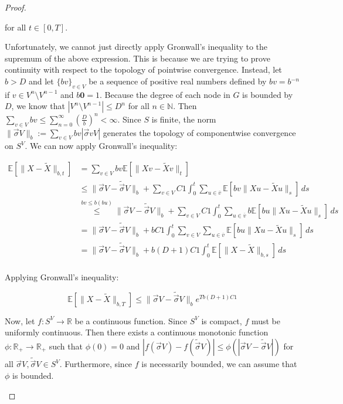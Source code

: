 \documentclass[12pt]{article}
\newcommand{\mb}{\mathbb}
\newcommand{\ra}{\rightarrow}
\newcommand{\ov}{\overline}
\newcommand{\os}{\overset}
\newcommand{\ind}{\hspace{24pt}}
\newcommand{\ex}[1]{\mb{E}\left[#1\right]}			%
\renewcommand{\root}{\mathbf{0}}				%
\renewcommand{\v}{v}							%
\newcommand{\vv}{u}								%
\renewcommand{\S}{S}							%
\newcommand{\s}{\sigma}							%
\newcommand{\sv}{\vec{\s}}						%
\renewcommand{\b}{b}							%
\newcommand{\T}{T}								%
\renewcommand{\t}{t}							%
\renewcommand{\tt}{s}							%
\newcommand{\X}{X}								%
\newcommand{\cl}{\ov}							%
\newcommand{\const}{C}							%
\newcommand{\degr}{D}							%
\newcommand{\sln}[1]{^{#1}}						%
\newcommand{\alt}[1]{\widetilde{#1}}			%
\begin{document}
\begin{proof}
\begin{enumerate}[(a)]
for all \(\t \in [0,\T]\).

\ind Unfortunately, we cannot just directly apply Gronwall's inequality to the supremum of the above expression. This is because we are trying to prove continuity with respect to the topology of pointwise convergence. Instead, let \(\b{} > \degr\) and let \(\{\b{\v}\}_{\v \in  V}\) be a sequence of positive real numbers defined by \(\b{\v} = \b{}^{-n}\) if \(\v \in  V\sln{n}\setminus  V\sln{n-1}\) and \(\b{\root} = 1\). Because the degree of each node in \(G\) is bounded by \(\degr\), we know that \(| V\sln{n}\setminus  V\sln{n-1}| \leq \degr^{n}\) for all \(n\in \mb{N}\). Then \(\sum_{\v \in  V} \b{\v} \leq \sum_{n=0}^\infty \left(\frac{\degr}{\b{}}\right)^{n} < \infty\). Since \(\S\) is finite, the norm \(\|\sv{}{ V}\|_{\b{}} := \sum_{\v \in  V} \b{\v}|\sv{\v}{ V}|\) generates the topology of componentwise convergence on \(\S^ V\). We can now apply Gronwall's inequality:

\begin{align*}
\ex{\|\X{}{} - \alt{\X}{{}{}}\|_{\b{},\t}} &= \sum_{\v \in  V} \b{\v}\ex{\|\X{\v}{} - \alt{\X}{{\v}{}}\|_\t}\\
&\leq \|\sv{}{ V} - \alt{\sv}{}{V}\|_{\b{}} + \sum_{\v \in  V}\const{1}\int_0^\t \sum_{\vv \in \cl{\v}} \ex{\b{\v}\|\X{\vv}{} - \alt{\X}{{\vv}{}}\|_\tt}\,d\tt\\
&\os{\b{\v}\leq \b{}(\b{\vv})}{\leq} \|\sv{}{ V} - \alt{\sv}{}{V}\|_{\b{}} + \sum_{\v \in  V}\const{1}\int_0^\t \sum_{\vv \in \cl{\v}} \b{}\ex{\b{\vv}\|\X{\vv}{} - \alt{\X}{{\vv}{}}\|_\tt}\,d\tt\\
&= \|\sv{}{ V} - \alt{\sv}{}{V}\|_{\b{}} + \b{}\const{1}\int_0^\t \sum_{\v \in  V}\sum_{\vv \in \cl{\v}} \ex{\b{\vv}\|\X{\vv}{} - \alt{\X}{{\vv}{}}\|_\tt}\,d\tt\\
&=\|\sv{}{ V} - \alt{\sv}{}{V}\|_{\b{}} + \b{}(\degr+1)\const{1}\int_0^\t \ex{\|\X{}{} - \alt{\X}{{}{}}\|_{\b{},\tt}}\,d\tt\\
\end{align*}

Applying Gronwall's inequality:

\[\ex{\|\X{}{} - \alt{\X}{{}{}}\|_{\b{},\T}} \leq \|\sv{}{ V} - \alt{\sv}{}{V}\|_{\b{}}e^{\T\b{}(\degr+1)\const{1}}\]

Now, let \(f: \S^ V \ra \mb{R}\) be a continuous function. Since \(\S^ V\) is compact, \(f\) must be uniformly continuous. Then there exists a continuous monotonic function \(\phi: \mb{R}_+ \ra \mb{R}_+\) such that \(\phi(0) = 0\) and \(|f(\sv{}{ V}) - f(\alt{\sv}{}{V})| \leq \phi(|\sv{}{ V} - \alt{\sv}{}{V}|)\) for all \(\sv{}{ V},\alt{\sv}{}{V}\in \S^ V\). Furthermore, since \(f\) is necessarily bounded, we can assume that \(\phi\) is bounded.


\end{enumerate}
\end{proof}
\end{document}
